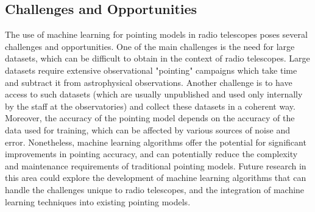 \subsection{Challenges and Opportunities}
The use of machine learning for pointing models in radio telescopes poses several challenges and opportunities.
One of the main challenges is the need for large datasets, which can be difficult to obtain in the context of radio telescopes.
Large datasets require extensive observational "pointing" campaigns which take time and subtract it from astrophysical observations.
Another challenge is to have access to such datasets (which are usually unpublished and used only internally by the staff at the observatories)
and collect these datasets in a coherent way. 
Moreover, the accuracy of the pointing model depends on the accuracy of the data used for training, which can be affected by various sources of noise and error.
Nonetheless, machine learning algorithms offer the potential for significant improvements in pointing accuracy,
and can potentially reduce the complexity and maintenance requirements of traditional pointing models.
Future research in this area could explore the development of machine learning algorithms that can handle the challenges unique to radio telescopes,
and the integration of machine learning techniques into existing pointing models.